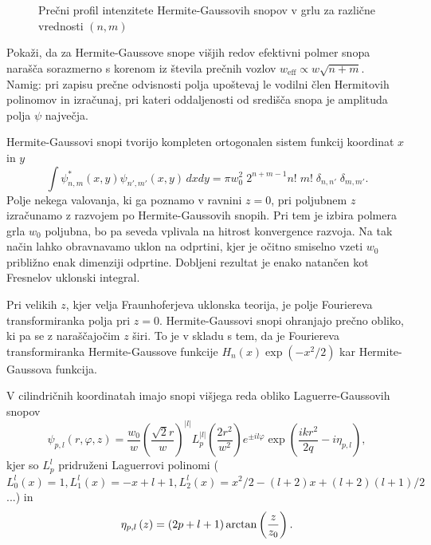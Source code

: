 \begin{figure}[h]
\centering
\def\svgwidth{90truemm} 

\caption{Prečni profil intenzitete Hermite-Gaussovih snopov v grlu 
za različne vrednosti $(n,m)$}
\label{fig:Gauss-Hermitevi-snopi}
\end{figure}

\begin{definition}
\label{naloga:HG}
Pokaži, da za Hermite-Gaussove snope višjih redov efektivni polmer snopa 
narašča sorazmerno s korenom iz števila prečnih vozlov $ w_{\mathrm{eff}}\propto w\sqrt{n+m}$.\\
Namig: pri zapisu prečne odvisnosti polja upoštevaj le vodilni člen Hermitovih polinomov 
in izračunaj, pri kateri oddaljenosti od središča snopa je amplituda polja $\psi$ največja.
\end{definition}

\begin{remark}
 Hermite-Gaussovi snopi tvorijo kompleten
ortogonalen sistem funkcij koordinat $x$ in $y$
\begin{equation}
\int\psi_{n,m}^{*}(x,y)\psi_{n',m'}(x,y)\, dx dy=\pi w_{0}^{2}\; 
2^{n+m-1}n!\;m!\; \delta_{n,n'}\;\delta_{m,m'}.
\end{equation}
Polje nekega valovanja, ki ga poznamo v ravnini $z=0$, pri
poljubnem $z$ izračunamo z razvojem po Hermite-Gaussovih snopih. Pri tem
je izbira polmera grla $w_{0}$ poljubna, bo pa seveda vplivala na
hitrost konvergence razvoja. Na tak način lahko obravnavamo uklon
na odprtini, kjer je očitno smiselno vzeti $w_{0}$ približno enak
dimenziji odprtine. Dobljeni rezultat je enako natančen kot Fresnelov
uklonski integral.

Pri velikih $z$, kjer velja Fraunhoferjeva uklonska teorija, je
polje Fouriereva transformiranka polja pri $z=0$. Hermite-Gaussovi
snopi ohranjajo prečno obliko, ki pa se z naraščajočim $z$ širi. 
To je v skladu s tem, da je Fouriereva transformiranka Hermite-Gaussove funkcije 
$H_{n}(x)\exp(-x^{2}/2)$ kar Hermite-Gaussova funkcija.
\end{remark}

V cilindričnih koordinatah imajo snopi višjega reda obliko Laguerre-Gaussovih 
snopov
\begin{equation}
\psi_{p,l}(r,\varphi,z)=\frac{w_{0}}{w}\left(\frac{\sqrt{2}r}{w}\right)^{|l|}
L_{p}^{|l|}\left(\frac{2r^{2}}{w^{2}}\right)e^{\pm il\varphi}\exp\left(\frac{ikr^{2}}{2q}-i\eta_{p,l}\right),
\label{eq:Gauss-Laguerrevi}
\end{equation}
kjer so $L_{p}^{l}$ pridruženi Laguerrovi polinomi ($L_{0}^{l}(x) = 1, 
L_{1}^{l}(x) = -x+l+1, 
L_{2}^{l}(x) = x^2/2-(l+2)x+(l+2)(l+1)/2
$ ...) in 
\begin{equation}\index{Gouyeva faza}
\eta_{p,l}\left(z\right)=(2p+l+1)\arctan\left(\frac{z}{z_{0}}\right).
\label{eq:etaGL}
\end{equation}

